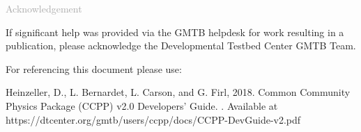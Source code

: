 \begin{titlepage}
\vspace*{0.5cm}
\noindent

\begin{flushleft}
\textcolor{darkgray}{\LARGE Acknowledgement}
\vspace*{1cm}\par

If significant help was provided via the GMTB helpdesk for work resulting in a publication, please acknowledge the Developmental Testbed Center GMTB Team.\\
\vspace*{1cm}\par
For referencing this document please use:\\ 
\vspace*{1cm}\par
Heinzeller, D., L. Bernardet, L. Carson, and G. Firl, 2018. Common Community Physics Package (CCPP) v2.0 Developers' Guide. . Available at https://dtcenter.org/gmtb/users/ccpp/docs/CCPP-DevGuide-v2.pdf

\end{flushleft}
\end{titlepage}
\pagebreak{}





